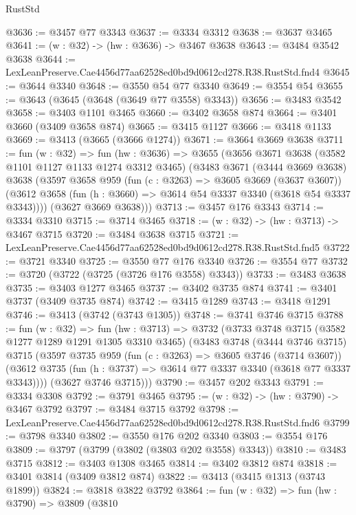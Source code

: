 \begin{lexlean}{RustStd}
\begin{coremodule}
@3636 := @3457 @77 @3343
@3637 := @3334 @3312
@3638 := @3637 @3465
@3641 := (w : @32) -> (hw : @3636) -> @3467 @3638
@3643 := @3484 @3542 @3638
@3644 := LexLeanPreserve.Cae4456d77aa62528ed0bd9d0612cd278.R38.RustStd.fnd4
@3645 := @3644 @3340
@3648 := @3550 @54 @77 @3340
@3649 := @3554 @54
@3655 := @3643 (@3645 (@3648 (@3649 @77 @3558) @3343))
@3656 := @3483 @3542
@3658 := @3403 @1101 @3465
@3660 := @3402 @3658 @874
@3664 := @3401 @3660 (@3409 @3658 @874)
@3665 := @3415 @1127
@3666 := @3418 @1133
@3669 := @3413 (@3665 (@3666 @1274))
@3671 := @3664 @3669 @3638
@3711 := fun (w : @32) =>
  fun (hw : @3636) =>
  @3655
    (@3656
      @3671
      @3638
      (@3582 @1101 @1127 @1133 @1274 @3312 @3465)
      (@3483
        @3671
        (@3444 @3669 @3638)
        @3638
        (@3597
          @3658
          @959
          (fun (c : @3263) => @3605 @3669 (@3637 @3607))
          (@3612 @3658 (fun (h : @3660) => @3614 @54 @3337 @3340 (@3618 @54 @3337 @3343))))
        (@3627 @3669 @3638)))
@3713 := @3457 @176 @3343
@3714 := @3334 @3310
@3715 := @3714 @3465
@3718 := (w : @32) -> (hw : @3713) -> @3467 @3715
@3720 := @3484 @3638 @3715
@3721 := LexLeanPreserve.Cae4456d77aa62528ed0bd9d0612cd278.R38.RustStd.fnd5
@3722 := @3721 @3340
@3725 := @3550 @77 @176 @3340
@3726 := @3554 @77
@3732 := @3720 (@3722 (@3725 (@3726 @176 @3558) @3343))
@3733 := @3483 @3638
@3735 := @3403 @1277 @3465
@3737 := @3402 @3735 @874
@3741 := @3401 @3737 (@3409 @3735 @874)
@3742 := @3415 @1289
@3743 := @3418 @1291
@3746 := @3413 (@3742 (@3743 @1305))
@3748 := @3741 @3746 @3715
@3788 := fun (w : @32) =>
  fun (hw : @3713) =>
  @3732
    (@3733
      @3748
      @3715
      (@3582 @1277 @1289 @1291 @1305 @3310 @3465)
      (@3483
        @3748
        (@3444 @3746 @3715)
        @3715
        (@3597
          @3735
          @959
          (fun (c : @3263) => @3605 @3746 (@3714 @3607))
          (@3612 @3735 (fun (h : @3737) => @3614 @77 @3337 @3340 (@3618 @77 @3337 @3343))))
        (@3627 @3746 @3715)))
@3790 := @3457 @202 @3343
@3791 := @3334 @3308
@3792 := @3791 @3465
@3795 := (w : @32) -> (hw : @3790) -> @3467 @3792
@3797 := @3484 @3715 @3792
@3798 := LexLeanPreserve.Cae4456d77aa62528ed0bd9d0612cd278.R38.RustStd.fnd6
@3799 := @3798 @3340
@3802 := @3550 @176 @202 @3340
@3803 := @3554 @176
@3809 := @3797 (@3799 (@3802 (@3803 @202 @3558) @3343))
@3810 := @3483 @3715
@3812 := @3403 @1308 @3465
@3814 := @3402 @3812 @874
@3818 := @3401 @3814 (@3409 @3812 @874)
@3822 := @3413 (@3415 @1313 (@3743 @1899))
@3824 := @3818 @3822 @3792
@3864 := fun (w : @32) =>
  fun (hw : @3790) =>
  @3809
    (@3810

\end{coremodule}
\end{lexlean}
